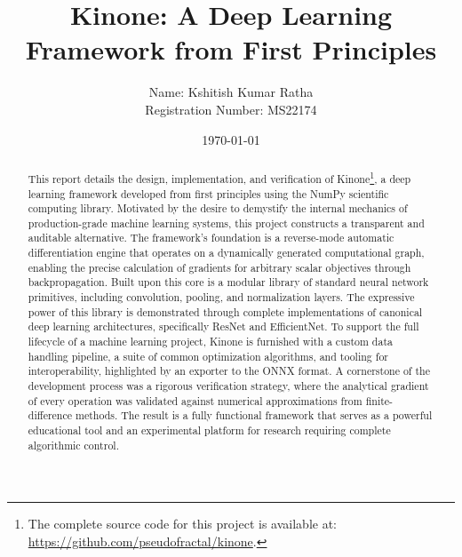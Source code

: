 \documentclass[a4paper]{article}
\begin{document}
\title{\textbf{Kinone: A Deep Learning Framework from First Principles}}

\author{
 Name: Kshitish Kumar Ratha \\
 Registration Number: MS22174 \\
}

\date{\today}

\maketitle

\begin{abstract}

    This report details the design, implementation, and verification of Kinone\footnote{The complete source code for this project is available at: \url{https://github.com/pseudofractal/kinone}.}, a deep learning framework developed from first principles using the NumPy scientific computing library. Motivated by the desire to demystify the internal mechanics of production-grade machine learning systems, this project constructs a transparent and auditable alternative. The framework's foundation is a reverse-mode automatic differentiation engine that operates on a dynamically generated computational graph, enabling the precise calculation of gradients for arbitrary scalar objectives through backpropagation. Built upon this core is a modular library of standard neural network primitives, including convolution, pooling, and normalization layers. The expressive power of this library is demonstrated through complete implementations of canonical deep learning architectures, specifically ResNet and EfficientNet. To support the full lifecycle of a machine learning project, Kinone is furnished with a custom data handling pipeline, a suite of common optimization algorithms, and tooling for interoperability, highlighted by an exporter to the ONNX format. A cornerstone of the development process was a rigorous verification strategy, where the analytical gradient of every operation was validated against numerical approximations from finite-difference methods. The result is a fully functional framework that serves as a powerful educational tool and an experimental platform for research requiring complete algorithmic control.

\end{abstract}

\pagebreak

\tableofcontents

\pagebreak
\end{document}

